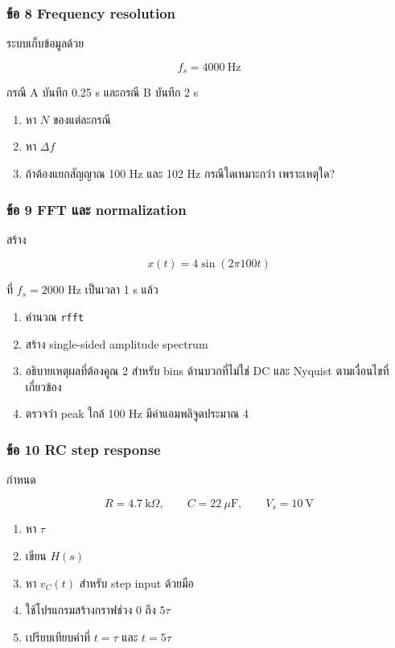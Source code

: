 \subsubsection{ข้อ 8 Frequency resolution}

ระบบเก็บข้อมูลด้วย

\[
f_s=4000\ \text{Hz}
\]

กรณี A บันทึก 0.25 s และกรณี B บันทึก 2 s

\begin{enumerate}
    \item หา $N$ ของแต่ละกรณี
    \item หา $\Delta f$
    \item ถ้าต้องแยกสัญญาณ 100 Hz และ 102 Hz กรณีใดเหมาะกว่า เพราะเหตุใด?
\end{enumerate}

\subsubsection{ข้อ 9 FFT และ normalization}

สร้าง

\[
x(t)=4\sin(2\pi100t)
\]

ที่ $f_s=2000$ Hz เป็นเวลา 1 s แล้ว

\begin{enumerate}
    \item คำนวณ \texttt{rfft}
    \item สร้าง single-sided amplitude spectrum
    \item อธิบายเหตุผลที่ต้องคูณ 2 สำหรับ bins ด้านบวกที่ไม่ใช่ DC และ Nyquist ตามเงื่อนไขที่เกี่ยวข้อง
    \item ตรวจว่า peak ใกล้ 100 Hz มีค่าแอมพลิจูดประมาณ 4
\end{enumerate}

\subsubsection{ข้อ 10 RC step response}

กำหนด

\[
R=4.7\ \text{k}\Omega,\qquad C=22\ \mu\text{F},\qquad V_s=10\ \text{V}
\]

\begin{enumerate}
    \item หา $\tau$
    \item เขียน $H(s)$
    \item หา $v_C(t)$ สำหรับ step input ด้วยมือ
    \item ใช้โปรแกรมสร้างกราฟช่วง $0$ ถึง $5\tau$
    \item เปรียบเทียบค่าที่ $t=\tau$ และ $t=5\tau$
\end{enumerate}

